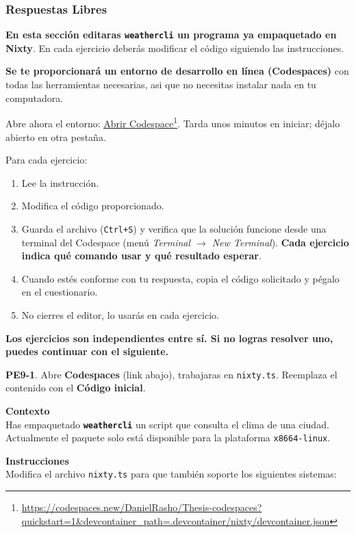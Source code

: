 \subsubsection{Respuestas Libres}

\textbf{En esta sección editaras \texttt{weathercli} un programa ya empaquetado en Nixty}. En cada ejercicio deberás modificar el código siguiendo las instrucciones.

\textbf{Se te proporcionará un entorno de desarrollo en línea (Codespaces)} con todas las herramientas necesarias, asi que no necesitas instalar nada en tu computadora.

Abre ahora el entorno: \href{https://codespaces.new/DanielRasho/Thesis-codespaces?quickstart=1&devcontainer_path=.devcontainer/nixty/devcontainer.json}{\underline{Abrir Codespace}}\footnote{\url{https://codespaces.new/DanielRasho/Thesis-codespaces?quickstart=1&devcontainer_path=.devcontainer/nixty/devcontainer.json}}. Tarda unos minutos en iniciar; déjalo abierto en otra pestaña.

Para cada ejercicio:

\begin{enumerate}
\item Lee la instrucción.
\item Modifica el código proporcionado.
\item Guarda el archivo (\texttt{Ctrl+S}) y verifica que la solución funcione desde una terminal del Codespace (menú \emph{Terminal $\rightarrow$ New Terminal}). \textbf{Cada ejercicio indica qué comando usar y qué resultado esperar}.
\item Cuando estés conforme con tu respuesta, copia el código solicitado y pégalo en el cuestionario.
\item No cierres el editor, lo usarás en cada ejercicio.
\end{enumerate}

\textbf{Los ejercicios son independientes entre sí. Si no logras resolver uno, puedes continuar con el siguiente.}

\textbf{PE9-1}. Abre \textbf{Codespaces} (link abajo), trabajaras en \texttt{nixty.ts}. Reemplaza el contenido con el \textbf{Código inicial}.

\textbf{Contexto}\\
Has empaquetado \textbf{\texttt{weathercli}} un script que consulta el clima de una ciudad. Actualmente el paquete solo está disponible para la plataforma \texttt{x86\textunderscore{}64-linux}.

\textbf{Instrucciones}\\
Modifica el archivo \texttt{nixty.ts} para que también soporte los siguientes sistemas:

